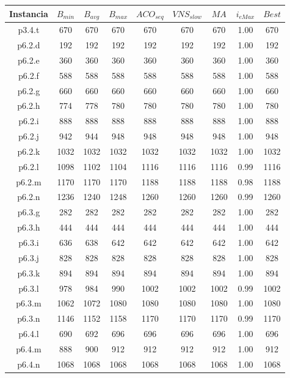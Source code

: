\begin{table}
\begin{center}
\begin{tabular}{ |c|c|c|c|c|c|c|c|c| } 
\hline
Instancia & $B_{min}$ & $B_{avg}$ & $B_{max}$ & $ACO_{seq}$ & $VNS_{slow}$ & $MA$ & $i_{eMax}$ & $Best$ \\
\hline
p3.4.t & 670 & 670 & 670 & 670 & 670 & 670 & 1.00 & 670  \\
p6.2.d & 192 & 192 & 192 & 192 & 192 & 192 & 1.00 & 192  \\
p6.2.e & 360 & 360 & 360 & 360 & 360 & 360 & 1.00 & 360  \\
p6.2.f & 588 & 588 & 588 & 588 & 588 & 588 & 1.00 & 588  \\
p6.2.g & 660 & 660 & 660 & 660 & 660 & 660 & 1.00 & 660  \\
p6.2.h & 774 & 778 & 780 & 780 & 780 & 780 & 1.00 & 780  \\
p6.2.i & 888 & 888 & 888 & 888 & 888 & 888 & 1.00 & 888  \\
p6.2.j & 942 & 944 & 948 & 948 & 948 & 948 & 1.00 & 948  \\
p6.2.k & 1032 & 1032 & 1032 & 1032 & 1032 & 1032 & 1.00 & 1032  \\
p6.2.l & 1098 & 1102 & 1104 & 1116 & 1116 & 1116 & 0.99 & 1116  \\
p6.2.m & 1170 & 1170 & 1170 & 1188 & 1188 & 1188 & 0.98 & 1188  \\
p6.2.n & 1236 & 1240 & 1248 & 1260 & 1260 & 1260 & 0.99 & 1260  \\
p6.3.g & 282 & 282 & 282 & 282 & 282 & 282 & 1.00 & 282  \\
p6.3.h & 444 & 444 & 444 & 444 & 444 & 444 & 1.00 & 444  \\
p6.3.i & 636 & 638 & 642 & 642 & 642 & 642 & 1.00 & 642  \\
p6.3.j & 828 & 828 & 828 & 828 & 828 & 828 & 1.00 & 828  \\
p6.3.k & 894 & 894 & 894 & 894 & 894 & 894 & 1.00 & 894  \\
p6.3.l & 978 & 984 & 990 & 1002 & 1002 & 1002 & 0.99 & 1002  \\
p6.3.m & 1062 & 1072 & 1080 & 1080 & 1080 & 1080 & 1.00 & 1080  \\
p6.3.n & 1146 & 1152 & 1158 & 1170 & 1170 & 1170 & 0.99 & 1170  \\
p6.4.l & 690 & 692 & 696 & 696 & 696 & 696 & 1.00 & 696  \\
p6.4.m & 888 & 900 & 912 & 912 & 912 & 912 & 1.00 & 912  \\
p6.4.n & 1068 & 1068 & 1068 & 1068 & 1068 & 1068 & 1.00 & 1068  \\

\end{tabular}
\end{center}
\end{table}
